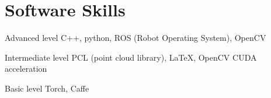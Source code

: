 \documentclass{tccv}
\begin{document}
\section{Software Skills}
\begin{factlist}

\item{Advanced  level}
     {C++, python, ROS (Robot Operating System), OpenCV}

\item{Intermediate level}
     {PCL (point cloud library), \LaTeX, OpenCV CUDA acceleration}

\item{Basic level}
     {Torch, Caffe}

\end{factlist}
\end{document}
